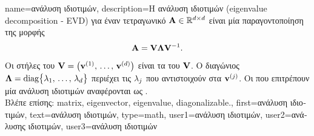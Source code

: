 {name={\foreignlanguage{greek}{ανάλυση ιδιοτιμών}}, 
	description={\foreignlanguage{greek}{Η ανάλυση ιδιοτιμών} 
		(eigenvalue decomposition - EVD) \foreignlanguage{greek}{για έναν τετραγωνικό}  
		${\bf A} \in \mathbb{R}^{d \times d}$ \foreignlanguage{greek}{είναι μία παραγοντοποίηση 
		της μορφής $${\bf A} = \mathbf{V} {\bm \Lambda} \mathbf{V}^{-1}.$$ 
		Οι στήλες του}  $\mathbf{V} = \big( {\bf v}^{(1)}, \,\ldots, \,{\bf v}^{(d)} \big)$ \foreignlanguage{greek}{είναι τα}  
		 \foreignlanguage{greek}{του}  $\mathbf{V}$. \foreignlanguage{greek}{Ο διαγώνιος}   
		 ${\bm \Lambda} = {\rm diag} \big\{ \lambda_{1}, \,\ldots, \,\lambda_{d} \big\}$ 
		\foreignlanguage{greek}{περιέχει τις}  $\lambda_{j}$ \foreignlanguage{greek}{που αντιστοιχούν στα} 
		 ${\bf v}^{(j)}$. \foreignlanguage{greek}{Οι} 
		\foreignlanguage{greek}{που επιτρέπουν μία ανάλυση ιδιοτιμών αναφέρονται ως} . 
		\\
		\foreignlanguage{greek}{Βλέπε επίσης:} \gls{matrix}, \gls{eigenvector}, \gls{eigenvalue}, \gls{diagonalizable}.},
	first={\foreignlanguage{greek}{ανάλυση ιδιοτιμών}},
	text={\foreignlanguage{greek}{ανάλυση ιδιοτιμών}},
	type=math,
	user1={\foreignlanguage{greek}{ανάλυση ιδιοτιμών}}, %
	user2={\foreignlanguage{greek}{ανάλυσης ιδιοτιμών}}, %
	user3={\foreignlanguage{greek}{ανάλυση ιδιοτιμών}} %
}

